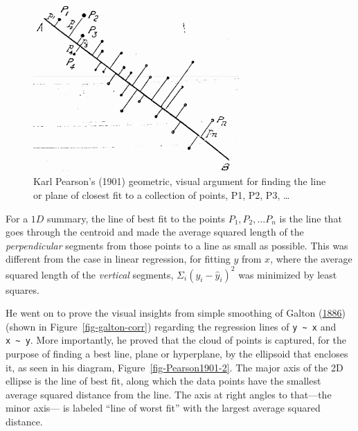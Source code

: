 \documentclass[
  letterpaper,
  10pt,
  krantz2]{krantz}
\begin{document}
\begin{figure}

{\centering \includegraphics[width=0.7\textwidth,height=\textheight]{images/Pearson1901.png}

}

\caption{\label{fig-Pearson1901}Karl Pearson's (1901) geometric, visual
argument for finding the line or plane of closest fit to a collection of
points, P1, P2, P3, \ldots{}}

\end{figure}

For a \(1D\) summary, the line of best fit to the points
\(P_1, P_2, \dots P_n\) is the line that goes through the centroid and
made the average squared length of the \emph{perpendicular} segments
from those points to a line as small as possible. This was different
from the case in linear regression, for fitting \(y\) from \(x\), where
the average squared length of the \emph{vertical} segments,
\(\Sigma_i (y_i - \hat{y}_i)^2\) was minimized by least squares.

He went on to prove the visual insights from simple smoothing of Galton
(\protect\hyperlink{ref-Galton:1886}{1886}) (shown in
Figure~\ref{fig-galton-corr}) regarding the regression lines of
\texttt{y\ \textasciitilde{}\ x} and \texttt{x\ \textasciitilde{}\ y}.
More importantly, he proved that the cloud of points is captured, for
the purpose of finding a best line, plane or hyperplane, by the
ellipsoid that encloses it, as seen in his diagram,
Figure~\ref{fig-Pearson1901-2}. The major axis of the 2D ellipse is the
line of best fit, along which the data points have the smallest average
squared distance from the line. The axis at right angles to that---the
minor axis--- is labeled ``line of worst fit'' with the largest average
squared distance.
\end{document}
